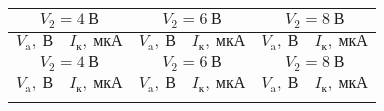 \documentclass[a4paper, 12pt]{article}
\begin{document}
\begin{longtable}{|c|c|c|c|c|c|}
	\hline
        \multicolumn{2}{|c|}{$V_2 = 4\ \text{В}$} &
        \multicolumn{2}{c|}{$V_2 = 6\ \text{В}$} &
        \multicolumn{2}{c|}{$V_2 = 8\ \text{В}$} \\ \hline
        $V_\text{a},\ \text{В}$           & $I_\text{к},\ \text{мкА}$          & $V_\text{a},\ \text{В}$           & $I_\text{к},\ \text{мкА}$         &
$V_\text{a},\ \text{В}$           & $I_\text{к},\ \text{мкА}$         \\ \hline
	\endfirsthead
	\hline
        \multicolumn{2}{|c|}{$V_2 = 4\ \text{В}$} &
        \multicolumn{2}{c|}{$V_2 = 6\ \text{В}$} &
        \multicolumn{2}{c|}{$V_2 = 8\ \text{В}$} \\ \hline
        $V_\text{a},\ \text{В}$           & $I_\text{к},\ \text{мкА}$          & $V_\text{a},\ \text{В}$           & $I_\text{к},\ \text{мкА}$         &
$V_\text{a},\ \text{В}$           & $I_\text{к},\ \text{мкА}$         \\ \hline
	\endhead
	\hline
	\endfoot

	\endlastfoot


\end{longtable}
\end{document}
